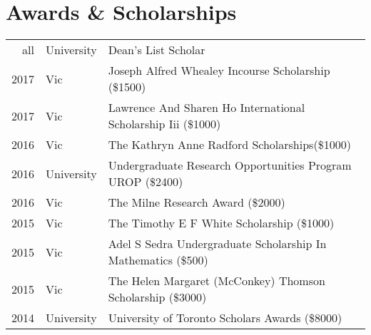 \documentclass[]{deedy-resume-openfont}
\begin{document}
\begin{minipage}[t]{0.66\textwidth}
    \section{Awards \& Scholarships} 
    \begin{small}
        \begin{tabular}{rll}
            all      	 & University  & Dean’s List Scholar \\
            2017         & Vic         & Joseph Alfred Whealey Incourse Scholarship (\$1500)  \\ 
            2017         & Vic         & Lawrence And Sharen Ho International Scholarship Iii (\$1000) \\ 
            2016 		 & Vic		   & The Kathryn Anne Radford Scholarships(\$1000) \\
            2016	     & University  & Undergraduate Research Opportunities Program UROP (\$2400) \\ 
            2016	     & Vic  	   & The Milne Research Award (\$2000) \\
            2015 		 & Vic 		   & The Timothy E F White Scholarship (\$1000) \\ 
            2015         & Vic         & Adel S Sedra Undergraduate Scholarship In Mathematics (\$500) \\
            2015	     & Vic         & The Helen Margaret (McConkey) Thomson Scholarship (\$3000) \\ 
            2014 		 & University  & University of Toronto Scholars Awards (\$8000) \\
            \end{tabular}
    \end{small}
    \sectionsep
    
    
    \end{minipage} 
    
\end{document}
